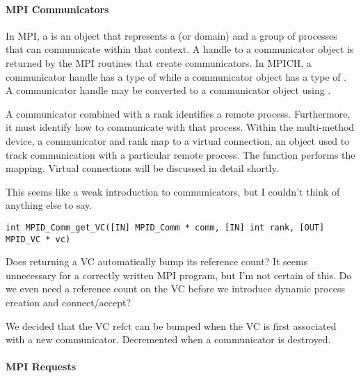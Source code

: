 
\paragraph{MPI Communicators}

In MPI, a  is an object that represents a
 (or domain) and a group of processes that can
communicate within that context.  A handle to a communicator object is returned
by the MPI routines that create communicators.  In MPICH, a communicator handle
has a type of  while a communicator object has a type of
.  A communicator handle may be converted to a communicator
object using .

A communicator combined with a rank identifies a remote process.  Furthermore,
it must identify how to communicate with that process.  Within the multi-method
device, a communicator and rank map to a virtual connection, an object used to
track communication with a particular remote process.  The function
 performs the mapping.  Virtual connections will be
discussed in detail shortly.

\begin{cmt}[BRT]
  This seems like a weak introduction to communicators, but I couldn't think of
  anything else to say.
\end{cmt}

\begin{verbatim}
int MPID_Comm_get_VC([IN] MPID_Comm * comm, [IN] int rank, [OUT] MPID_VC * vc)
\end{verbatim}

\begin{cmt}[BRT]
  Does returning a VC automatically bump its reference count?  It seems
  unnecessary for a correctly written MPI program, but I'm not certain of this.
  Do we even need a reference count on the VC before we introduce dynamic
  process creation and connect/accept?
\end{cmt}

\begin{cmt}[ROB]
  We decided that the VC refct can be bumped when the VC is first associated
  with a new communicator.  Decremented when a communicator is destroyed.
\end{cmt}


\paragraph{MPI Requests}


